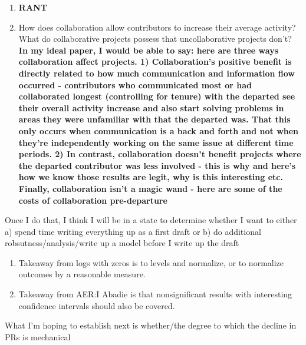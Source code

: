 \documentclass[12pt,notitlepage]{article}
\begin{document}
\begin{enumerate}
    \item \textbf{RANT}
    \item How does collaboration allow contributors to increase their average activity? What do collaborative projects possess that uncollaborative projects don't?\\
    \textbf{In my ideal paper, I would be able to say: here are three ways collaboration affect projects. 1) Collaboration's positive benefit is directly related to how much communication and information flow occurred - contributors who communicated most or had collaborated longest (controlling for tenure) with the departed see their overall activity increase and also start solving problems in areas they were unfamiliar with that the departed was. That this only occurs when communication is a back and forth and not when they're independently working on the same issue at different time periods. 2) In contrast, collaboration doesn't benefit projects where the departed contributor was less involved - this is why and here's how we know those results are legit, why is this interesting etc. Finally, collaboration isn't a magic wand - here are some of the costs of collaboration pre-departure}
\end{enumerate}

    
Once I do that, I think I will be in a state to determine whether I want to either a) spend time writing everything up as a first draft or b) do additional robsutness/analysis/write up a model before I write up the draft

\begin{enumerate}
    \item Takeaway from logs with zeros is to levels and normalize, or to normalize outcomes by a reasonable measure.
    \item Takeaway from AER:I Abadie is that nonsignificant results with interesting confidence intervals should also be covered. 
\end{enumerate}

What I'm hoping to establish next is whether/the degree to which the decline in PRs is mechanical
\end{document}
